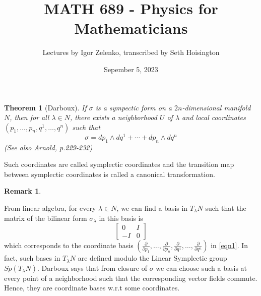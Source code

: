 \documentclass{article}
\title{MATH 689 - Physics for Mathematicians}
\author{Lectures by Igor Zelenko, transcribed by Seth Hoisington}
\date{Sepember 5, 2023}
\newcommand{\pd}[1]{\frac{\partial}{\partial #1}}
\newtheorem{thm}{Theorem}
\newtheorem{rk}{Remark}
\begin{document}
\maketitle
\begin{thm}[Darboux]
    If $\sigma$ is a sympectic form on a $2n$-dimensional manifold $N$, then for all $\lambda\in N$, there exists a neighborhood $U$ of $\lambda$ and local coordinates $(p_1,\dots,p_n,q^1,\dots,q^n)$ such that
    \[\sigma = dp_1\wedge dq^1 + \cdots + dp_n\wedge dq^n\label{eqn1}\]
    (See also Arnold, p.229-232)
\end{thm}
Such coordinates are called symplectic coordinates and the transition map between symplectic coordinates is called a canonical transformation.
\begin{rk}
    
\end{rk}
From linear algebra, for every $\lambda\in N$, we can find a basis in $T_\lambda N$ such that the matrix of the bilinear form $\sigma_\lambda$ in this basis is
\[\begin{bmatrix}
    0 & I \\ -I & 0
\end{bmatrix}\]
which corresponds to the coordinate basis $\left(\pd{p_1},\dots,\pd{p_n},\pd{q^1},\dots,\pd{q^n}\right)$ in \eqref{eqn1}. In fact, such bases in $T_\lambda N$ are defined modulo the Linear Symplectic group $Sp(T_\lambda N)$. Darboux says that from closure of $\sigma$ we can choose such a basis at every point of a neighborhood such that the corresponding vector fields commute. Hence, they are coordinate bases w.r.t some coordinates.
\end{document}
